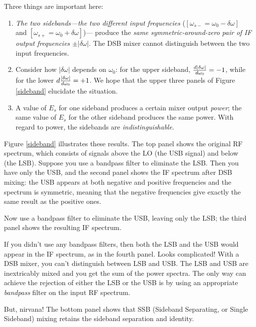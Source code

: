 \documentclass[12pt,preprint]{aastex}
\begin{document}
%
        Three things are important here: \begin{enumerate}

        \item {\it The two sidebands---the two different input
frequencies} ($[\omega_{s-}= \omega_0 - \delta \omega]$ and $[\omega_{s+}=
\omega_0 + \delta \omega]$)--- produce the {\it same
symmetric-around-zero pair of IF output frequencies $\pm |\delta
\omega|$}. The DSB mixer
cannot distinguish between the two input frequencies.

        \item Consider how $|\delta \omega|$ depends on $\omega_0$: for
          the upper sideband, ${d |\delta \omega| \over d\omega_0} = -1$,
          while for the lower $d {|\delta \omega| \over d\omega_0} =
          +1$. We hope that the upper three panels of Figure
          \ref{sideband} elucidate the situation.

        \item A value of $E_s$ for one sideband produces a certain mixer
output {\it power}; the same value of $E_s$ for the other sideband
produces the same power. With regard to power, the sidebands are {\it
indistinguishable}.

\end{enumerate}
%
Figure \ref{sideband} illustrates these results. The top panel shows the
original RF spectrum, which consists of signals above the LO (the USB
signal) and below (the LSB). Suppose you use a bandpass filter to
eliminate the LSB. Then you have only the USB, and the second panel
shows the IF spectrum after DSB mixing: the USB appears at both negative
and positive frequencies and the spectrum is symmetric, meaning that the
negative frequencies give exactly the same result as the positive ones.

Now use a bandpass filter to eliminate the USB, leaving only the LSB;
the third panel shows the resulting IF spectrum.

If you didn't use any bandpass filters, then both the LSB and the USB
would appear in the IF spectrum, as in the fourth panel. Looks
complicated! With a DSB mixer, you can't distinguish between LSB and
USB. The LSB and USB are inextricably
mixed and you get the sum of the power spectra. 
The only way can achieve the rejection of either the LSB or the USB is by
using an appropriate {\it bandpass} filter on the input RF spectrum. 

But, nirvana! The bottom panel shows that SSB (Sideband Separating, or
Single Sideband) mixing retains the sideband separation and identity.
\end{document}
